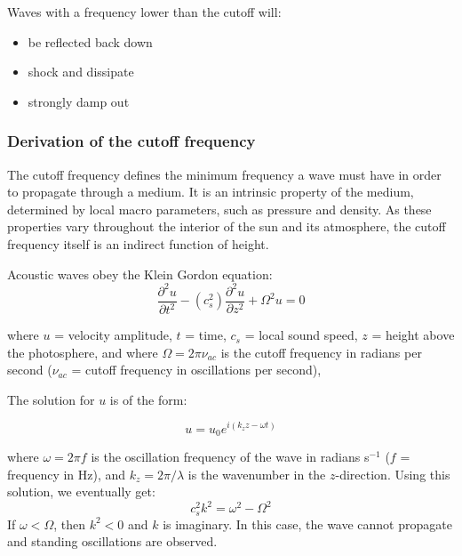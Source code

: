 Waves with a frequency lower than the cutoff will:
\begin{itemize}
    \item be reflected back down
    \item shock and dissipate
    \item strongly damp out
\end{itemize}



\subsubsection{Derivation of the cutoff frequency}

The cutoff frequency defines the minimum frequency a wave must have in order to
propagate through a medium.
It is an intrinsic property of the medium,
determined by local macro parameters, such as pressure and density.
As these properties vary throughout the interior of the sun and its atmosphere,
the cutoff frequency itself is an indirect function of height.


Acoustic waves obey the Klein Gordon equation:
\begin{equation}
    \frac{\partial^{2}u}{\partial t^{2}}
    - \left( c_{s}^{2} \right)
    \frac{\partial^{2}u}{\partial z^{2}}
    + \Omega^{2}u
    = 0
\end{equation}

where
$u$ = velocity amplitude,
$t$ = time,
$c_{s}$ = local sound speed,
$z$ = height above the photosphere, and
where $\Omega = 2\pi\nu_{ac}$
is the cutoff frequency in radians per second
($\nu_{ac}$ = cutoff frequency in oscillations per second),


The solution for $u$ is of the form:

\begin{equation}
    u = u_{0}e^{i\left( k_{z}z - \omega t \right)}
\end{equation}

where $\omega = 2 \pi f$ is the oscillation frequency of the wave
in radians s$^{-1}$ ($f$ = frequency in Hz), and $k_{z} = 2\pi/\lambda$
is the wavenumber in the $z$-direction.
Using this solution, we eventually get:
\begin{equation}
    c_{s}^{2} k^{2} = \omega^{2} - \Omega^{2}
\end{equation}
If $\omega < \Omega$, then $k^{2} < 0$ and $k$ is imaginary.
In this case, the wave cannot propagate and standing oscillations are
observed.

